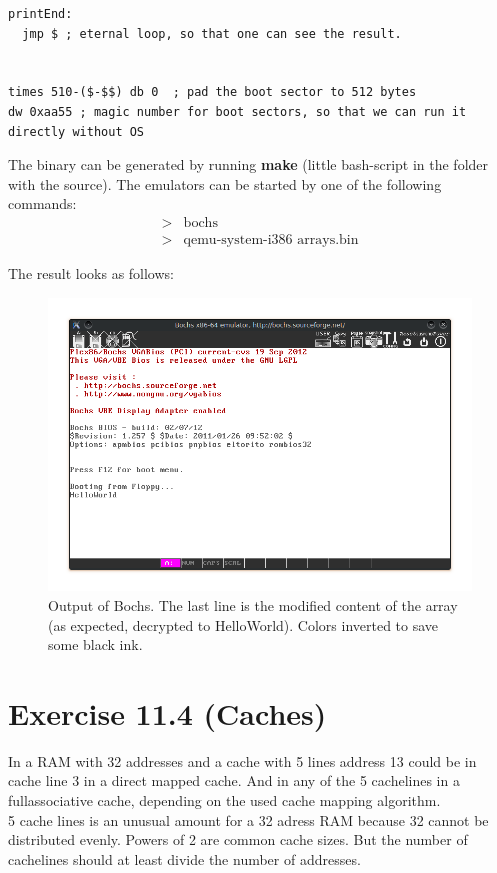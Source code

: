 \documentclass[10pt,a4paper]{scrartcl}
\newcommand{\subExercise}[1]{\vspace{0.5em} \noindent{\bf #1)}}
\begin{document}
\begin{verbatim}
printEnd:
  jmp $ ; eternal loop, so that one can see the result.


times 510-($-$$) db 0  ; pad the boot sector to 512 bytes
dw 0xaa55 ; magic number for boot sectors, so that we can run it directly without OS
\end{verbatim}

The binary can be generated by running \textbf{make} (little bash-script in the folder with the source).
The emulators can be started by one of the following commands:
\begin{align*}
>&\textrm{bochs} \\
>&\textrm{qemu-system-i386 arrays.bin}
\end{align*}

The result looks as follows:
\begin{figure}[H]
  \centering\includegraphics[width=0.9\linewidth]{images/helloWorld.png}
  \caption{Output of Bochs. The last line is the modified content of the array (as expected, decrypted to HelloWorld). Colors inverted to save some black ink.}
\end{figure}

\section*{Exercise 11.4 (Caches)}
\subExercise{a}
In a RAM with 32 addresses and a cache with 5 lines address 13 could be in cache line 3 in a direct mapped cache. And in any of the 5 cachelines in a fullassociative cache, depending on the used cache mapping algorithm.\\
\subExercise{b}
5 cache lines is an unusual amount for a 32 adress RAM because 32 cannot be distributed evenly.
Powers of 2 are common cache sizes. But the number of cachelines should at least divide the number of addresses.
\end{document}

